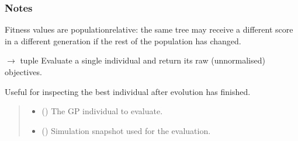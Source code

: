 \documentclass[letterpaper,10pt,english]{sphinxmanual}
\begin{document}
\begin{fulllineitems}
\begin{fulllineitems}
\begin{quote}
\begin{description}
\end{description}\end{quote}
\subsubsection*{Notes}

\sphinxAtStartPar
Fitness values are population\sphinxhyphen{}relative: the same tree may receive a
different score in a different generation if the rest of the population
has changed.

\end{fulllineitems}


\begin{fulllineitems}
\label{\detokenize{api:scheduler.FitnessEvaluator.evaluate_single}}
\pysigstartsignatures
\pysiglinewithargsret
{}
{\sphinxparamcomma {}\sphinxparamcomma {}}
{{ $\rightarrow$ tuple}}
\pysigstopsignatures
\sphinxAtStartPar
Evaluate a single individual and return its raw (un\sphinxhyphen{}normalised) objectives.

\sphinxAtStartPar
Useful for inspecting the best individual after evolution has finished.
\begin{quote}\begin{description}
\begin{itemize}
\item {} 
\sphinxAtStartPar
{} ({\hyperref[\detokenize{api:scheduler.Individual}]{}}) \textendash{} The GP individual to evaluate.

\item {} 
\sphinxAtStartPar
{} ({\hyperref[\detokenize{api:scheduler.SimulationSnapshot}]{}}) \textendash{} Simulation snapshot used for the evaluation.


\end{itemize}
\end{description}
\end{quote}
\end{fulllineitems}
\end{fulllineitems}
\end{document}
